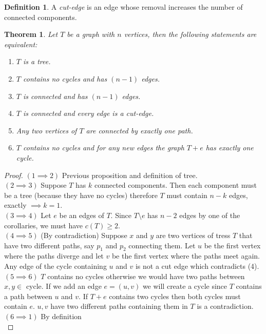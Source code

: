 \documentclass{article}
\newtheorem*{thm}{Theorem}
\theoremstyle{definition}
\newtheorem*{defn}{Definition}
\begin{document}
\begin{defn}
A \emph{cut-edge} is an edge whose removal increases the number of connected components.
\end{defn}

\begin{thm}
Let $T$ be a graph with $n$ vertices, then the following statements are equivalent:
\begin{enumerate}
\item $T$ is a tree.
\item $T$ contains no cycles and has $(n-1)$ edges.
\item $T$ is connected and has $(n-1)$ edges.
\item $T$ is connected and every edge is a cut-edge.
\item Any two vertices of $T$ are connected by exactly one path.
\item $T$ contains no cycles and for any new edges the graph $T + e$ has exactly one cycle.
\end{enumerate}
\end{thm}

\begin{proof}
$(1\implies 2)$ Previous proposition and definition of tree. \\
$(2\implies 3)$ Suppose $T$ has $k$ connected components.
Then each component must be a tree (because they have no cycles) therefore $T$ must contain $n-k$ edges, exactly $\implies k=1$. \\
$(3\implies 4)$ Let $e$ be an edges of $T$.
Since $T\setminus e$ has $n-2$ edges by one of the corollaries, we must have $c(T)\ge 2$. \\
$(4\implies 5)$ (By contradiction) Suppose $x$ and $y$ are two vertices of tress $T$ that have two different paths, say $p_1$ and $p_2$ connecting them.
Let $u$ be the first vertex where the paths diverge and let $v$ be the first vertex where the paths meet again.
Any edge of the cycle containing $u$ and $v$ is not a cut edge which contradicts (4). \\
$(5\implies 6)$ $T$ contains no cycles otherwise we would have two paths between $x,y\in$ cycle.
If we add an edge $e= (u,v)$ we will create a cycle since $T$ contains a path between $u$ and $v$. If $T+e$ contains two cycles then both cycles must contain $e$.
$u,v$ have two different paths containing them in $T$ is a contradiction. \\
$(6\implies 1)$ \lbrack By definition\rbrack \\
\end{proof}
\end{document}
